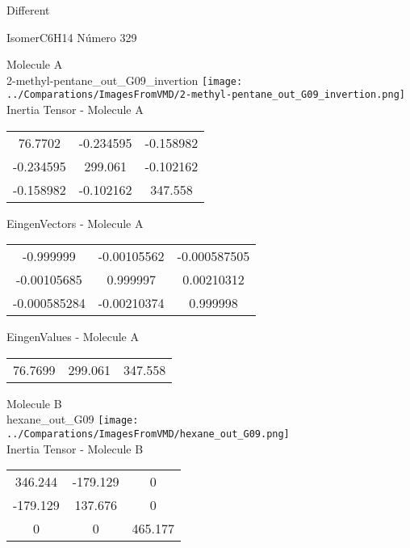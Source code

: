 \begin{center}
\vtab
\vtab
\textcolor{NavyBlue}{\Large Different}
\end{center}

 \newpage

\vtab[-2cm]
\begin{center}
{\large IsomerC6H14 \tab Número 329}
\end{center}
\begin{multicols}{2}
\begin{center}

Molecule A \\ 
2-methyl-pentane\_out\_G09\_invertion
\texttt{[image: ../Comparations/ImagesFromVMD/2-methyl-pentane\_out\_G09\_invertion.png]}
\\
Inertia Tensor - Molecule A \\
\vtab

\begin{tabular}{|c c c|}
76.7702	 & 	-0.234595	 & 	-0.158982	 \\
-0.234595	 & 	299.061	 & 	-0.102162	 \\
-0.158982	 & 	-0.102162	 & 	347.558
\end{tabular}

\vtab
 EingenVectors - Molecule A     \\
\vtab
\begin{tabular}{|c c c|}
-0.999999	 & 	-0.00105562	 & 	-0.000587505	 \\
-0.00105685	 & 	0.999997	 & 	0.00210312	 \\
-0.000585284	 & 	-0.00210374	 & 	0.999998
\end{tabular}

\vtab
 EingenValues - Molecule A     \\
\vtab
\begin{tabular}{|c c c|}
76.7699	 & 	299.061	 & 	347.558	 \\
\end{tabular}
\columnbreak

Molecule B \\ 
hexane\_out\_G09
\texttt{[image: ../Comparations/ImagesFromVMD/hexane\_out\_G09.png]}
\\
Inertia Tensor - Molecule B \\
\vtab

\begin{tabular}{|c c c|}
346.244	 & 	-179.129	 & 	0	 \\
-179.129	 & 	137.676	 & 	0	 \\
0	 & 	0	 & 	465.177
\end{tabular}


\end{center}
\end{multicols}
